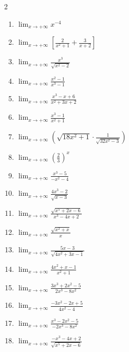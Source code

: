 \documentclass[12pt,a4paper]{article}
\begin{document}
\begin{multicols}{2}
\begin{enumerate}[label=1.\arabic*.]
    \item $\displaystyle \lim_{x \to +\infty} x^{-4}$
    \item $\displaystyle \lim_{x \to +\infty} \left[ \frac{2}{x^2+1} + \frac{3}{x+2} \right]$
    \item $\displaystyle \lim_{x \to +\infty} \frac{x^3}{\sqrt{x^2-2}}$
    \item $\displaystyle \lim_{x \to +\infty} \frac{x^2-1}{x^3-1}$
    \item $\displaystyle \lim_{x \to +\infty} \frac{x^3-x+6}{x^2+3x+2}$
    \item $\displaystyle \lim_{x \to +\infty} \frac{x^3-1}{x^2+1}$
    \item $\displaystyle \lim_{x \to +\infty} \left( \sqrt{18x^2+1}\cdot\frac{1}{\sqrt{32x^2-3}} \right)$
    \item $\displaystyle \lim_{x \to +\infty} \left( \frac{2}{3} \right)^{\!x}$
    \item $\displaystyle \lim_{x \to +\infty} \frac{x^3-5}{-x^2-4}$
    \item $\displaystyle \lim_{x \to +\infty} \frac{4x^3-2}{\sqrt{x-3}}$
    \item $\displaystyle \lim_{x \to +\infty} \frac{\sqrt{x^5+2x-6}}{x^3-4x+2}$
    \item $\displaystyle \lim_{x \to +\infty} \frac{\sqrt{x^2+x}}{x}$
    \item $\displaystyle \lim_{x \to +\infty} \frac{5x-3}{\sqrt{4x^2+3x-1}}$
    \item $\displaystyle \lim_{x \to +\infty} \frac{4x^2+x-1}{x^2+1}$
    \item $\displaystyle \lim_{x \to +\infty} \frac{3x^3+2x^2-5}{2x^3-8x^2}$
    \item $\displaystyle \lim_{x \to +\infty} \frac{-3x^2-2x+5}{4x^2-4}$
    \item $\displaystyle \lim_{x \to +\infty} \frac{x^3-2x^2-5}{-2x^3-8x^2}$
    \item $\displaystyle \lim_{x \to +\infty} \frac{-x^3-4x+2}{\sqrt{x^5+2x-6}}$
\end{enumerate}
\end{multicols}

\end{document}
